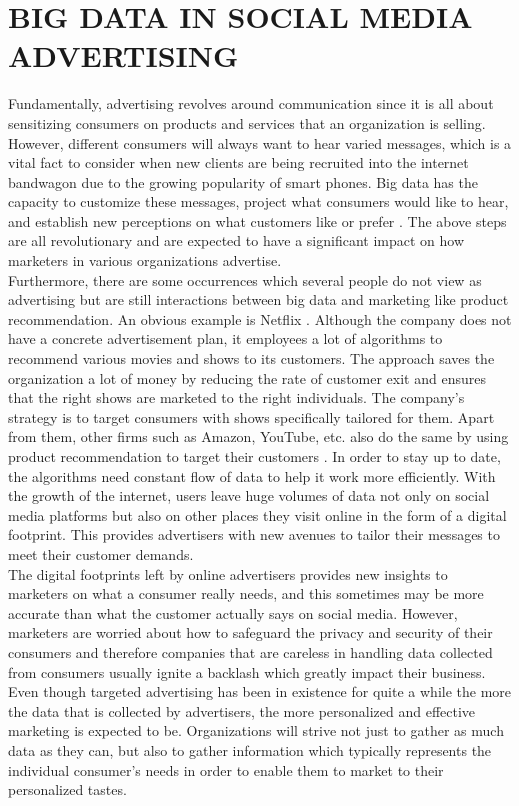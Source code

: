 \documentclass[sigconf]{acmart}
\begin{document}
\section{BIG DATA IN SOCIAL MEDIA ADVERTISING}

Fundamentally, advertising revolves around communication since it is all about sensitizing consumers on products and services that an organization is selling. However, different consumers will always want to hear varied messages, which is a vital fact to consider when new clients are being recruited into the internet bandwagon due to the growing popularity of smart phones. Big data has the capacity to customize these messages, project what consumers would like to hear, and establish new perceptions on what customers like or prefer \cite{HenselandDeis2010}. The above steps are all revolutionary and are expected to have a significant impact on how marketers in various organizations advertise.   \\

Furthermore, there are some occurrences which several people do not view as advertising but are still interactions between big data and marketing like product recommendation. An obvious example is Netflix \cite{8}. Although the company does not have a concrete advertisement plan, it employees a lot of algorithms to recommend various movies and shows to its customers. The approach saves the organization a lot of money by reducing the rate of customer exit and ensures that the right shows are marketed to the right individuals. The company’s strategy is to target consumers with shows specifically tailored for them. Apart from them, other firms such as Amazon, YouTube, etc. also do the same by using product recommendation to target their customers  \cite{8}. In order to stay up to date, the algorithms need constant flow of data to help it work more efficiently. With the growth of the internet, users leave huge volumes of data not only on social media platforms but also on other places they visit online in the form of a digital footprint.  This provides advertisers with new avenues to tailor their messages to meet their customer demands.  \\

The digital footprints left by online advertisers provides new insights to marketers on what a consumer really needs, and this sometimes may be more accurate than what the customer actually says on social media. However, marketers are worried about how to safeguard the privacy and security of their consumers and therefore companies that are careless in handling data collected from consumers usually ignite a backlash which greatly impact their business. Even though targeted advertising has been in existence for quite a while \cite{8} the more the data that is collected by advertisers, the more personalized and effective marketing is expected to be. Organizations will strive not just to gather as much data as they can, but also to gather information which typically represents the individual consumer’s needs in order to enable them to market to their personalized tastes.
\end{document}
